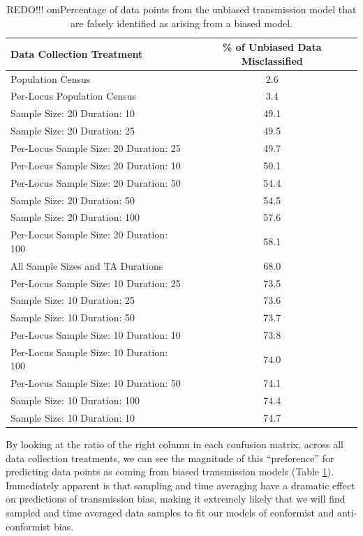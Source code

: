 \begin{table}[ht]

\begin{tabular}{|l|c|}
  \hline
Data Collection Treatment & \% of Unbiased Data Misclassified \\
  \hline
Population Census & 2.6 \\
  Per-Locus Population Census & 3.4 \\
  Sample Size:  20  Duration:  10 & 49.1 \\
  Sample Size:  20  Duration:  25 & 49.5 \\
  Per-Locus Sample Size:  20  Duration:  25 & 49.7 \\
  Per-Locus Sample Size:  20  Duration:  10 & 50.1 \\
  Per-Locus Sample Size:  20  Duration:  50 & 54.4 \\
  Sample Size:  20  Duration:  50 & 54.5 \\
  Sample Size:  20  Duration:  100 & 57.6 \\
  Per-Locus Sample Size:  20  Duration:  100 & 58.1 \\
  All Sample Sizes and TA Durations & 68.0 \\
  Per-Locus Sample Size:  10  Duration:  25 & 73.5 \\
  Sample Size:  10  Duration:  25 & 73.6 \\
  Sample Size:  10  Duration:  50 & 73.7 \\
  Per-Locus Sample Size:  10  Duration:  10 & 73.8 \\
  Per-Locus Sample Size:  10  Duration:  100 & 74.0 \\
  Per-Locus Sample Size:  10  Duration:  50 & 74.1 \\
  Sample Size:  10  Duration:  100 & 74.4 \\
  Sample Size:  10  Duration:  10 & 74.7 \\
   \hline
\end{tabular}

    \caption{REDO!!!  omPercentage of data points from the unbiased transmission model that are falsely identified as arising from a biased model.}
    \label{tab:misclassification-neutral}
\end{table}

By looking at the ratio of the right column in each confusion matrix, across all data collection treatments, we can see the magnitude of this ``preference'' for predicting data points as coming from biased transmission models (Table \ref{tab:misclassification-neutral}).  Immediately apparent is that sampling and time averaging have a dramatic effect on predictions of transmission bias, making it extremely likely that we will find sampled and time averaged data samples to fit our models of conformist and anti-conformist bias.  

